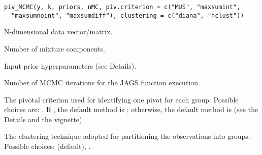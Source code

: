 \documentclass[a4paper]{book}
\begin{document}
%
\begin{Usage}
\begin{verbatim}
piv_MCMC(y, k, priors, nMC, piv.criterion = c("MUS", "maxsumint",
  "maxsumnoint", "maxsumdiff"), clustering = c("diana", "hclust"))
\end{verbatim}
\end{Usage}
%
\begin{Arguments}
\begin{ldescription}
\item[\code{y}] N-dimensional data vector/matrix.

\item[\code{k}] Number of mixture components.

\item[\code{priors}] Input prior hyperparameters (see Details).

\item[\code{nMC}] Number of MCMC iterations for the JAGS function execution.

\item[\code{piv.criterion}] The pivotal criterion used for identifying one pivot
for each group. Possible choices are: .
If , the default method is ;
otherwise, the default method is  (see the Details and
the vignette).

\item[\code{clustering}] The clustering technique adopted for partitioning the
 observations into  groups. Possible choices:  (default),
.
\end{ldescription}
\end{Arguments}
%
\end{document}

